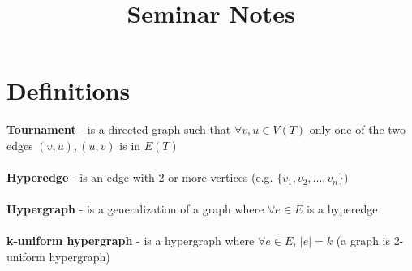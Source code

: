 \documentclass[a4paper,12pt]{article}
\begin{document}
	
\begin{titlepage}
	\title{Seminar Notes}
	\maketitle
\end{titlepage}

\section{Definitions} 

\textbf{Tournament} - is a directed graph such that $\forall v,u\in V(T)$ only one of the two edges $(v,u),(u,v)$ is in $E(T)$ \\
\\
\textbf{Hyperedge} - is an edge with 2 or more vertices (e.g. $\{v_1,v_2,...,v_n\})$ \\
\\
\textbf{Hypergraph} - is a generalization of a graph where $\forall e\in E$ is a hyperedge \\
\\
\textbf{k-uniform hypergraph} - is a hypergraph where $\forall e\in E$, $|e|=k$ (a graph is 2-uniform hypergraph)\\
\\
\end{document}
